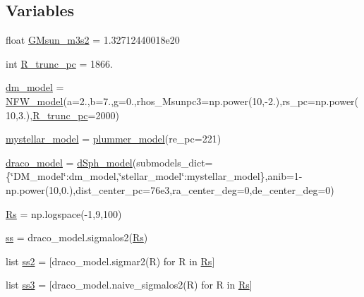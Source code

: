 \subsection*{Variables}
\begin{DoxyCompactItemize}
\item 
float \hyperlink{namespacedsph__model_a783ea3c074de2e7c951b342b5749a522}{G\+Msun\+\_\+m3s2} = 1.\+32712440018e20
\item 
int \hyperlink{namespacedsph__model_a03ec56ecf56f64e59a6be020a76a36f1}{R\+\_\+trunc\+\_\+pc} = 1866.
\item 
\hyperlink{namespacedsph__model_a83bb8253e5a6c16c6d8f2b3ae8643576}{dm\+\_\+model} = \hyperlink{classdsph__model_1_1NFW__model}{N\+F\+W\+\_\+model}(a=2.,b=7.,g=0.,rhos\+\_\+\+Msunpc3=np.\+power(10,-\/2.),rs\+\_\+pc=np.\+power(10,3.),\hyperlink{namespacedsph__model_a03ec56ecf56f64e59a6be020a76a36f1}{R\+\_\+trunc\+\_\+pc}=2000)
\item 
\hyperlink{namespacedsph__model_af9dc9391755a4aee2481a666d18e218a}{mystellar\+\_\+model} = \hyperlink{classdsph__model_1_1plummer__model}{plummer\+\_\+model}(re\+\_\+pc=221)
\item 
\hyperlink{namespacedsph__model_ab28142aa13968c1b7647e1fccabec0c6}{draco\+\_\+model} = \hyperlink{classdsph__model_1_1dSph__model}{d\+Sph\+\_\+model}(submodels\+\_\+dict=\{\char`\"{}D\+M\+\_\+model\char`\"{}\+:dm\+\_\+model,\char`\"{}stellar\+\_\+model\char`\"{}\+:mystellar\+\_\+model\},anib=1-\/np.\+power(10,0.),dist\+\_\+center\+\_\+pc=76e3,ra\+\_\+center\+\_\+deg=0,de\+\_\+center\+\_\+deg=0)
\item 
\hyperlink{namespacedsph__model_af25a421d0de32d247b1aa0e8cf4894e3}{Rs} = np.\+logspace(-\/1,9,100)
\item 
\hyperlink{namespacedsph__model_a47e0439ddc091a015abf3612c9ee26c3}{ss} = draco\+\_\+model.\+sigmalos2(\hyperlink{namespacedsph__model_af25a421d0de32d247b1aa0e8cf4894e3}{Rs})
\item 
list \hyperlink{namespacedsph__model_abcaee14ea865b10f10051c500197bd4d}{ss2} = \mbox{[}draco\+\_\+model.\+sigmar2(R) for R in \hyperlink{namespacedsph__model_af25a421d0de32d247b1aa0e8cf4894e3}{Rs}\mbox{]}
\item 
list \hyperlink{namespacedsph__model_a570b90342742f8795c9affea98066d87}{ss3} = \mbox{[}draco\+\_\+model.\+naive\+\_\+sigmalos2(R) for R in \hyperlink{namespacedsph__model_af25a421d0de32d247b1aa0e8cf4894e3}{Rs}\mbox{]}
\end{DoxyCompactItemize}


